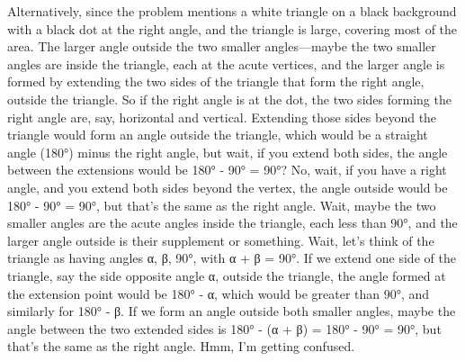 Alternatively, since the problem mentions a white triangle on a black background with a black dot at the right angle, and the triangle is large, covering most of the area. The larger angle outside the two smaller angles—maybe the two smaller angles are inside the triangle, each at the acute vertices, and the larger angle is formed by extending the two sides of the triangle that form the right angle, outside the triangle. So if the right angle is at the dot, the two sides forming the right angle are, say, horizontal and vertical. Extending those sides beyond the triangle would form an angle outside the triangle, which would be a straight angle (180°) minus the right angle, but wait, if you extend both sides, the angle between the extensions would be 180° - 90° = 90°? No, wait, if you have a right angle, and you extend both sides beyond the vertex, the angle outside would be 180° - 90° = 90°, but that's the same as the right angle. Wait, maybe the two smaller angles are the acute angles inside the triangle, each less than 90°, and the larger angle outside is their supplement or something. Wait, let's think of the triangle as having angles α, β, 90°, with α + β = 90°. If we extend one side of the triangle, say the side opposite angle α, outside the triangle, the angle formed at the extension point would be 180° - α, which would be greater than 90°, and similarly for 180° - β. If we form an angle outside both smaller angles, maybe the angle between the two extended sides is 180° - (α + β) = 180° - 90° = 90°, but that's the same as the right angle. Hmm, I'm getting confused. 

